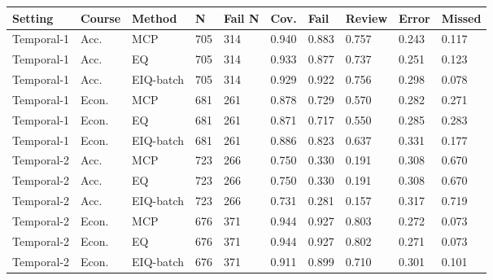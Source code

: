 \begin{tabular}{llllllllll}
\toprule
Setting & Course & Method & N & Fail N & Cov. & Fail & Review & Error & Missed\\
\midrule
Temporal-1 & Acc. & MCP & 705 & 314 & 0.940 & 0.883 & 0.757 & 0.243 & 0.117\\
Temporal-1 & Acc. & EQ & 705 & 314 & 0.933 & 0.877 & 0.737 & 0.251 & 0.123\\
Temporal-1 & Acc. & EIQ-batch & 705 & 314 & 0.929 & 0.922 & 0.756 & 0.298 & 0.078\\
Temporal-1 & Econ. & MCP & 681 & 261 & 0.878 & 0.729 & 0.570 & 0.282 & 0.271\\
Temporal-1 & Econ. & EQ & 681 & 261 & 0.871 & 0.717 & 0.550 & 0.285 & 0.283\\
Temporal-1 & Econ. & EIQ-batch & 681 & 261 & 0.886 & 0.823 & 0.637 & 0.331 & 0.177\\
Temporal-2 & Acc. & MCP & 723 & 266 & 0.750 & 0.330 & 0.191 & 0.308 & 0.670\\
Temporal-2 & Acc. & EQ & 723 & 266 & 0.750 & 0.330 & 0.191 & 0.308 & 0.670\\
Temporal-2 & Acc. & EIQ-batch & 723 & 266 & 0.731 & 0.281 & 0.157 & 0.317 & 0.719\\
Temporal-2 & Econ. & MCP & 676 & 371 & 0.944 & 0.927 & 0.803 & 0.272 & 0.073\\
Temporal-2 & Econ. & EQ & 676 & 371 & 0.944 & 0.927 & 0.802 & 0.271 & 0.073\\
Temporal-2 & Econ. & EIQ-batch & 676 & 371 & 0.911 & 0.899 & 0.710 & 0.301 & 0.101\\
\bottomrule
\end{tabular}